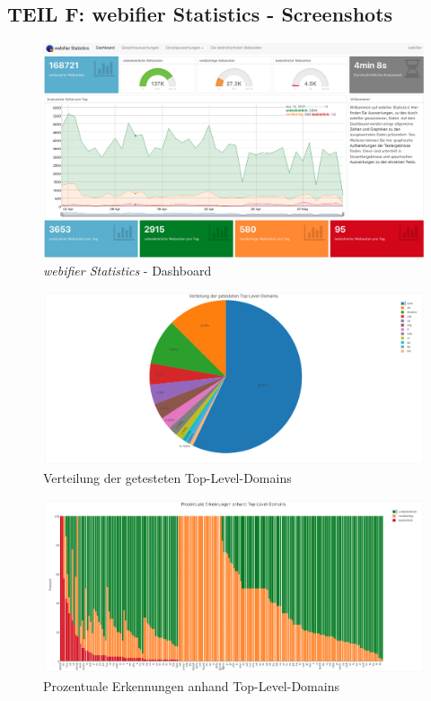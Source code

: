 \begin{landscape}

\section*{TEIL F: webifier Statistics - Screenshots}
\label{app:f}

\begin{figure}[H]
  \centering
  \includegraphics[width=\textheight]{images/stats/dashboard}
  \caption{\textit{webifier Statistics} - Dashboard}
\end{figure}

\begin{figure}[H]
  \centering
  \includegraphics[width=\textheight]{images/stats/tldverteilung}
  \caption{Verteilung der getesteten Top-Level-Domains}
\end{figure}


\begin{figure}[H]
  \centering
  \includegraphics[width=\textheight]{images/stats/tldprozentual}
  \caption{Prozentuale Erkennungen anhand Top-Level-Domains}
\end{figure}



\end{landscape}
